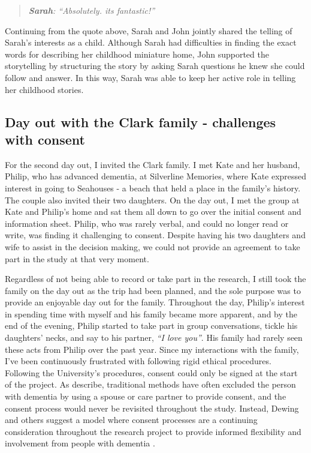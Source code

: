 \begin{quote}
\textit{    \textbf{Sarah}: ``Absolutely. its fantastic!''
}
\end{quote}

Continuing from the quote above, Sarah and John jointly shared the telling of Sarah's interests as a child. Although Sarah had difficulties in finding the exact words for describing her childhood miniature home, John supported the storytelling by structuring the story by asking Sarah questions he knew she could follow and answer. In this way, Sarah was able to keep her active role in telling her childhood stories.


\subsection{Day out with the Clark family - challenges with consent}
\label{ClarkFamily}
For the second day out, I invited the Clark family. I met Kate and her husband, Philip, who has advanced dementia, at Silverline Memories, where Kate expressed interest in going to Seahouses - a beach that held a place in the family's history. The couple also invited their two daughters. On the day out, I met the group at Kate and Philip's home and sat them all down to go over the initial consent and information sheet. Philip, who was rarely verbal, and could no longer read or write, was finding it challenging to consent. Despite having his two daughters and wife to assist in the decision making, we could not provide an agreement to take part in the study at that very moment. 

Regardless of not being able to record or take part in the research, I still took the family on the day out as the trip had been planned, and the sole purpose was to provide an enjoyable day out for the family. Throughout the day, Philip's interest in spending time with myself and his family became more apparent, and by the end of the evening, Philip started to take part in group conversations, tickle his daughters' necks, and say to his partner, \textit{``I love you''}. His family had rarely seen these acts from Philip over the past year. Since my interactions with the family, I've been continuously frustrated with following rigid ethical procedures. Following the University's procedures, consent could only be signed at the start of the project. As \cite{dewing_participatory_2007} describe, traditional methods have often excluded the person with dementia by using a spouse or care partner to provide consent, and the consent process would never be revisited throughout the study. Instead, Dewing and others suggest a model where consent processes are a continuing consideration throughout the research project to provide informed flexibility and involvement from people with dementia \citep{dewing_participatory_2007,slaughter2007consent,mckeown_actively_2009}.


